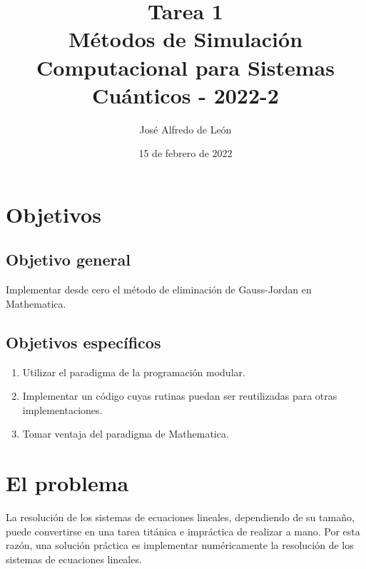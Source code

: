 \documentclass[11pt,letterpaper]{article}
\author{José Alfredo de León}
\title{Tarea 1\\
\large{Métodos de Simulación Computacional para Sistemas Cuánticos - 2022-2}}
\begin{document}
\date{15 de febrero de 2022}
\maketitle

\section{Objetivos}
\subsection{Objetivo general}
Implementar desde cero el método de eliminación de Gauss-Jordan en Mathematica.

\subsection{Objetivos específicos}
\begin{enumerate}
\item Utilizar el paradigma de la programación modular.
\item Implementar un código cuyas rutinas puedan ser reutilizadas
para otras implementaciones.
\item Tomar ventaja del paradigma de Mathematica.
\end{enumerate}

\section{El problema}
La resolución de los sistemas de ecuaciones lineales, dependiendo de su tamaño,
puede convertirse en una tarea titánica e impráctica de realizar a mano. 
Por esta razón, una solución práctica es implementar numéricamente
la resolución de los sistemas de ecuaciones lineales. 
\end{document}
